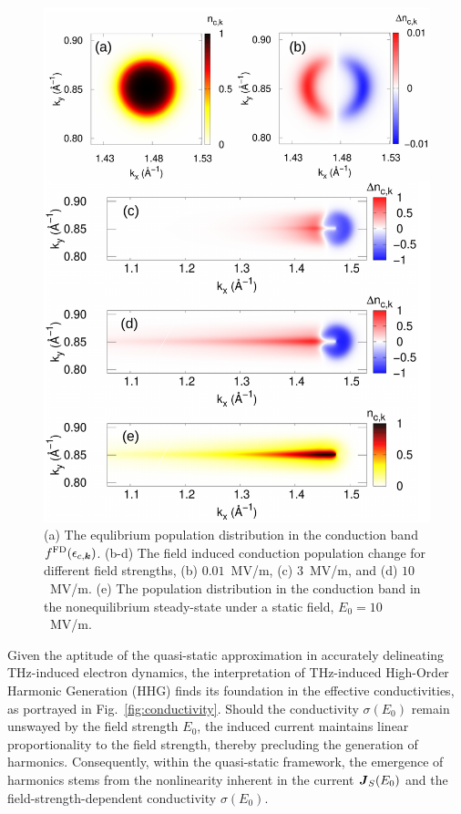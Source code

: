  \begin{figure}[htb]
    \centering
\includegraphics[width=1.0\linewidth]{pic/pop_fig.pdf}
\caption{\label{fig:pop_f}
(a) The equlibrium population distribution in the conduction band $f^{\mathrm{FD}}(\epsilon_{c,\boldsymbol k})$. (b-d) The field induced conduction population change for different field strengths, (b) $0.01$~MV/m, (c) $3$~MV/m, and (d) $10$~MV/m. (e) The population distribution in the conduction band in the nonequilibrium steady-state under a static field, $E_0=10$~MV/m.}
\end{figure}

Given the aptitude of the quasi-static approximation in accurately delineating THz-induced electron
dynamics, the interpretation of THz-induced High-Order Harmonic Generation (HHG) finds its
foundation in the effective conductivities, as portrayed in Fig.~\ref{fig:conductivity}. Should the
conductivity $\sigma(E_0)$ remain unswayed by the field strength $E_0$, the induced current
maintains linear proportionality to the field strength, thereby precluding the generation of
harmonics. Consequently, within the quasi-static framework, the emergence of harmonics stems from
the nonlinearity inherent in the current $\boldsymbol J_S(E_0)$ and the field-strength-dependent
conductivity $\sigma(E_0)$.

